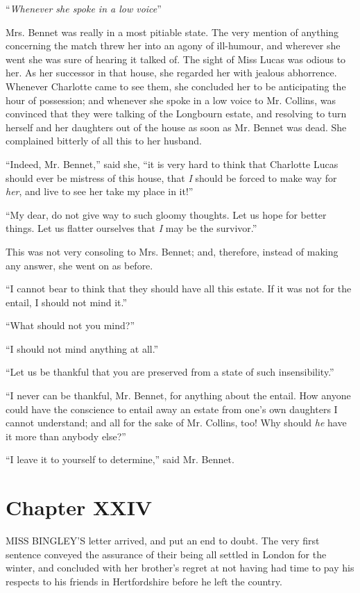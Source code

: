 \documentclass[12pt,openright]{book}
\begin{document}
“\textit{Whenever she spoke in a low voice}”

Mrs. Bennet was really in a most pitiable state. The very mention of anything concerning the match threw her into an agony of ill-humour, and wherever she went she was sure of hearing it talked of. The sight of Miss Lucas was odious to her. As her successor in that house, she regarded her with jealous abhorrence. Whenever Charlotte came to see them, she concluded her to be anticipating the hour of possession; and whenever she spoke in a low voice to Mr. Collins, was convinced that they were talking of the Longbourn estate, and resolving to turn herself and her daughters out of the house as soon as Mr. Bennet was dead. She complained bitterly of all this to her husband.

“Indeed, Mr. Bennet,” said she, “it is very hard to think that Charlotte Lucas should ever be mistress of this house, that \textit{I} should be forced to make way for \textit{her}, and live to see her take my place in it!”

“My dear, do not give way to such gloomy thoughts. Let us hope for better things. Let us flatter ourselves that \textit{I} may be the survivor.”

This was not very consoling to Mrs. Bennet; and, therefore, instead of making any answer, she went on as before.

“I cannot bear to think that they should have all this estate. If it was not for the entail, I should not mind it.”

“What should not you mind?”

“I should not mind anything at all.”

“Let us be thankful that you are preserved from a state of such insensibility.”

“I never can be thankful, Mr. Bennet, for anything about the entail. How anyone could have the conscience to entail away an estate from one’s own daughters I cannot understand; and all for the sake of Mr. Collins, too! Why should \textit{he} have it more than anybody else?”

“I leave it to yourself to determine,” said Mr. Bennet.

\chapter{Chapter XXIV}

\noindent  MISS BINGLEY’S letter arrived, and put an end to doubt. The very first sentence conveyed the assurance of their being all settled in London for the winter, and concluded with her brother’s regret at not having had time to pay his respects to his friends in Hertfordshire before he left the country.
\end{document}
